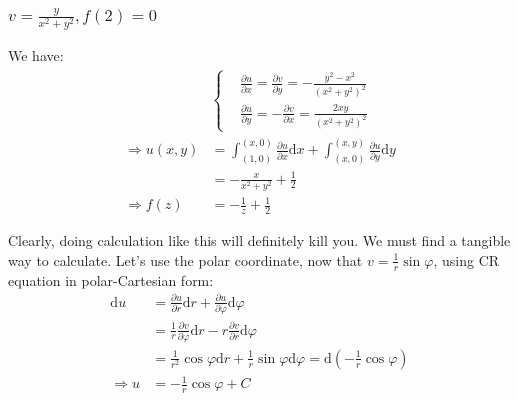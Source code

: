 \documentclass[]{ctexart}
\newcommand{\di}{\mathrm{d}}
\newcommand{\pa}{\partial}
\begin{document}
				
			\subsubsection{$v=\frac{y}{x^{2}+y^{2}}, f(2)=0$}
				We have:
				\begin{equation*}
				\begin{aligned}
				&\begin{cases}
				&\frac{\pa u}{\pa x}=\frac{\pa v}{\pa y}=-\frac{y^2-x^2}{\left(x^2+y^2\right)^2}\\
				&\frac{\pa u}{\pa y}=-\frac{\pa v}{\pa x}=\frac{2 x y}{\left(x^2+y^2\right)^2}
				\end{cases}\\
				\Rightarrow u(x,y)&=\int_{(1,0)}^{(x,0)}\frac{\pa u}{\pa x} \di x+\int_{(x,0)}^{(x,y)}\frac{\pa u}{\pa y} \di y\\
				&=-\frac{x}{x^2+y^2}+\frac{1}{2}\\
				\Rightarrow f(z)&=-\frac{1}{z}+\frac{1}{2}
				\end{aligned}
				\end{equation*}
				
			Clearly, doing calculation like this will definitely kill you. We must find a tangible way to calculate. Let's use the polar coordinate, now that $v=\frac{1}{r}\sin\varphi$, using CR equation in polar-Cartesian form:
				\begin{equation*}
				\begin{aligned}
					\di u&=\frac{\pa u}{\pa r}\di r+\frac{\pa u}{\pa \varphi}\di \varphi\\
					&=\frac{1}{r}\frac{\pa v}{\pa \varphi}\di r-r\frac{\pa v}{\pa r}\di \varphi\\
					&=\frac{1}{r^2}\cos\varphi\di r+\frac{1}{r}\sin\varphi\di \varphi=\di(-\frac{1}{r}\cos\varphi)\\
					\Rightarrow u&=-\frac{1}{r}\cos\varphi+C
				\end{aligned}
				\end{equation*}		
				
\end{document}
